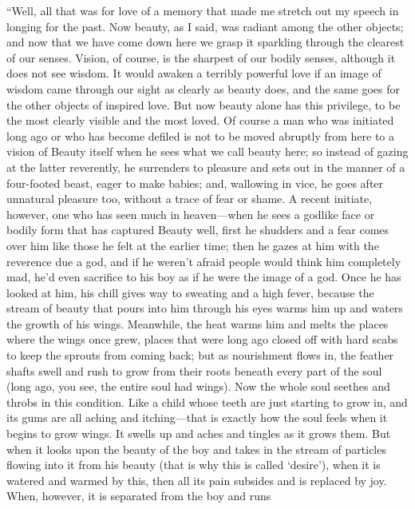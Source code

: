 “Well, all that was for love of a memory that made me stretch out my 
speech in longing for the past. Now beauty, as I said, was
radiant among the other objects; and now that we have come down here we
grasp it sparkling through the clearest of our senses. Vision, of
course, is the sharpest of our bodily senses, although it does not see
wisdom. It would awaken a terribly powerful love if an image of wisdom
came through our sight as clearly as beauty does, and the same goes for
the other objects of inspired love. But now beauty alone has
this privilege, to be the most clearly visible and the most loved. Of
course a man who was initiated long ago or who has become defiled is not
to be moved abruptly from here to a vision of Beauty itself when he sees
what we call beauty here; so instead of gazing at the latter reverently,
he surrenders to pleasure and sets out in the manner of a four-footed
beast, eager to make babies; and, wallowing in vice, he 
goes after unnatural pleasure too, without a trace of fear or shame. A
recent initiate, however, one who has seen much in heaven---when he sees
a godlike face or bodily form that has captured Beauty well, first he
shudders and a fear comes over him like those he felt at the earlier
time; then he gazes at him with the reverence due a god, and if he
weren't afraid people would think him completely mad, he'd even
sacrifice to his boy as if he were the image of a god. Once he
has looked at him, his chill gives way to sweating and a high fever,
because the stream of beauty that pours into him through his eyes warms
him up and waters the growth of his wings. Meanwhile, the heat warms him
and melts the places where the wings once grew, places that were long
ago closed off with hard scabs to keep the sprouts from coming back; but
as nourishment flows in, the feather shafts swell and rush to grow from
their roots beneath every part of the soul (long ago, you see, the
entire soul had wings). Now the whole soul seethes and throbs in
this condition. Like a child whose teeth are just starting to grow in,
and its gums are all aching and itching---that is exactly how the soul
feels when it begins to grow wings. It swells up and aches and tingles
as it grows them. But when it looks upon the beauty of the boy and takes
in the stream of particles flowing into it from his beauty (that is why
this is called
‘desire'), when it is
watered and warmed by this, then all its pain subsides and is replaced
by joy. When, however, it is separated from the boy and runs
